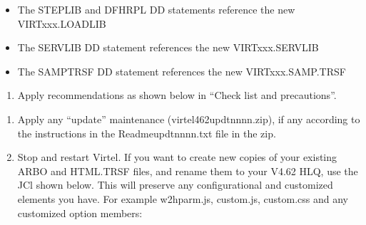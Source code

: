 \documentclass[letterpaper,10pt,english]{sphinxmanual}
\begin{document}
\begin{itemize}
\item {} 
\sphinxAtStartPar
The STEPLIB and DFHRPL DD statements reference the new VIRTxxx.LOADLIB

\item {} 
\sphinxAtStartPar
The SERVLIB DD statement references the new VIRTxxx.SERVLIB

\item {} 
\sphinxAtStartPar
The SAMPTRSF DD statement references the new VIRTxxx.SAMP.TRSF

\end{itemize}
\begin{enumerate}
%
\setcounter{enumi}{10}
\item {} 
\sphinxAtStartPar
Apply recommendations as shown below in “Check list and precautions”.

\end{enumerate}

\newpage
\begin{enumerate}
%
\setcounter{enumi}{11}
\item {} 
\sphinxAtStartPar
Apply any “update” maintenance (virtel462updtnnnn.zip), if any according to the instructions in the Readme\sphinxhyphen{}updtnnnn.txt file in the zip.

\item {} 
\sphinxAtStartPar
Stop and restart Virtel. If you want to create new copies of your existing ARBO and HTML.TRSF files, and rename them to your V4.62 HLQ, use the JCl shown below. This will preserve any configurational and customized elements you have. For example w2hparm.js, custom.js, custom.css and any customized option members:\sphinxhyphen{}

\end{enumerate}
\end{document}
